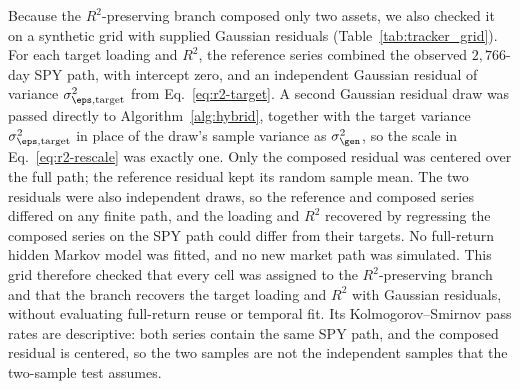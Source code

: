 Because the $R^2$-preserving branch composed only two assets, we also
checked it on a synthetic grid with supplied Gaussian residuals
(Table~\ref{tab:tracker_grid}). For each target loading and $R^2$, the
reference series combined the observed $2{,}766$-day SPY path, with
intercept zero, and an independent Gaussian residual of variance
$\sigma_{\eps,\mathrm{target}}^2$ from Eq.~\eqref{eq:r2-target}. A
second Gaussian residual draw was passed directly to
Algorithm~\ref{alg:hybrid}, together with the target variance
$\sigma_{\eps,\mathrm{target}}^2$ in place of the draw's sample
variance as $\sigma_{\gen}^2$, so the scale in
Eq.~\eqref{eq:r2-rescale} was exactly one. Only the composed residual
was centered over the full path; the reference residual kept its
random sample mean. The two residuals were also independent draws, so
the reference and composed series differed on any finite path, and
the loading and $R^2$ recovered by regressing the composed series on
the SPY path could differ from their targets. No full-return hidden
Markov model was fitted, and no new market path was simulated. This
grid therefore checked that every cell was assigned to the
$R^2$-preserving branch and that the branch recovers the target
loading and $R^2$ with Gaussian residuals, without evaluating
full-return reuse or temporal fit. Its Kolmogorov--Smirnov pass rates
are descriptive: both series contain the same SPY path, and the
composed residual is centered, so the two samples are not the
independent samples that the two-sample test assumes.

